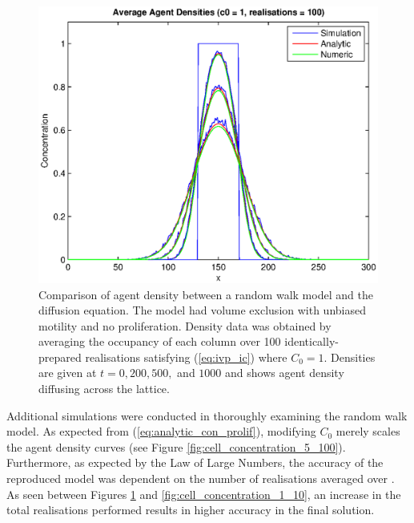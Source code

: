 \documentclass[11pt,titlepage,a4paper]{article}
\begin{document}
		\begin{figure}[tbh]
			\centering
				\includegraphics[width=\textwidth]{./Figures/cell_concentration_1_100.eps}
			\caption{Comparison of agent density between a random walk model and the diffusion equation. The model had volume exclusion with unbiased motility and no proliferation. Density data was obtained by averaging the occupancy of each column over 100 identically-prepared realisations satisfying (\ref{eq:ivp_ic}) where $C_0 = 1$. Densities are given at $t = 0, 200, 500,$ and $1000$ and shows agent density diffusing across the lattice.}
			\label{fig:cell_concentration_1_100}
		\end{figure}
	
		Additional simulations were conducted in thoroughly examining the random walk model. As expected from (\ref{eq:analytic_con_prolif}), modifying $C_0$ merely scales the agent density curves (see Figure \ref{fig:cell_concentration_5_100}). Furthermore, as expected by the Law of Large Numbers, the accuracy of the reproduced model was dependent on the number of realisations averaged over \cite{lawlargenum}. As seen between Figures \ref{fig:cell_concentration_1_100} and \ref{fig:cell_concentration_1_10}, an increase in the total realisations performed results in higher accuracy in the final solution.
	
\end{document}
